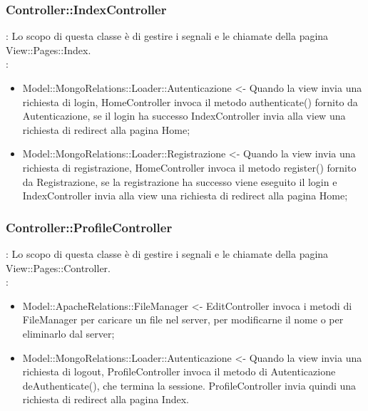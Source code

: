 {		\subsubsection{Controller::IndexController}{
				\textbf{\tipo}: Lo scopo di questa classe è di gestire i segnali e le chiamate della pagina View::Pages::Index.\\	
				\textbf{\relaz}:
					\begin{itemize}
						\item Model::MongoRelations::Loader::Autenticazione <- Quando la view invia una richiesta di login, HomeController invoca il metodo authenticate() fornito da Autenticazione, se il login ha successo IndexController invia alla view una richiesta di redirect alla pagina Home;
						\item Model::MongoRelations::Loader::Registrazione <- Quando la view invia una richiesta di registrazione, HomeController invoca il metodo register() fornito da Registrazione, se la registrazione ha successo viene eseguito il login e IndexController invia alla view una richiesta di redirect alla pagina Home;
					\end{itemize}
		}
				
		\subsubsection{Controller::ProfileController}{
						\textbf{\tipo}: Lo scopo di questa classe è di gestire i segnali e le chiamate della pagina View::Pages::Controller.\\	
						\textbf{\relaz}:
							\begin{itemize}
								\item Model::ApacheRelations::FileManager <- EditController invoca i metodi di FileManager per caricare un file nel server, per modificarne il nome o per eliminarlo dal server;
								\item Model::MongoRelations::Loader::Autenticazione <- Quando la view invia una richiesta di logout, ProfileController invoca il metodo di Autenticazione deAuthenticate(), che termina la sessione. ProfileController invia quindi una richiesta di redirect alla pagina Index.
							\end{itemize}
				}
			}